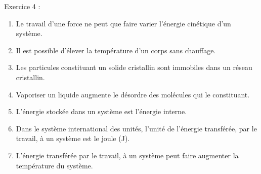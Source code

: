 \documentclass[12pt, french]{article}
\begin{document}
\begin{Box2}{Exercice 4 : }
\begin{enumerate}
          \begin{enumerate}
            \item Le travail d’une force ne peut que faire varier l’énergie cinétique d’un système.
              \item Il est possible d’élever la température d’un corps sans chauffage.
                \item Les particules constituant un solide cristallin sont immobiles dans un réseau cristallin.
                \item Vaporiser un liquide augmente le désordre des molécules qui le constituant.
                \item L’énergie stockée dans un système est l’énergie interne.
                  \item Dans le système international des unités, l’unité de l’énergie transférée, par le travail, à un
système est le joule (J).
\item L’énergie transférée par le travail, à un système peut faire augmenter la température du
système.
          \end{enumerate}
  \end{enumerate}
\end{Box2}




\end{document}
